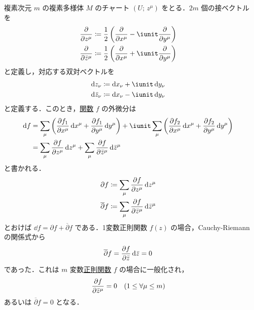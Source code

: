 \documentclass[geometry_main]{subfiles}
\begin{document}
複素次元 $m$ の複素多様体 $M$ のチャート $(U;\, z^\mu)$ をとる．$2m$ 個の接ベクトルを
\begin{align} 
	\pdv{}{z^\mu} &\coloneqq \frac{1}{2} \left(\pdv{}{x^\mu} - \iunit \pdv{}{y^\mu}\right) \\
	\pdv{}{\bar{z}^\mu} &\coloneqq \frac{1}{2} \left(\pdv{}{x^\mu} + \iunit \pdv{}{y^\mu}\right) \\
\end{align}
と定義し，対応する双対ベクトルを
\begin{align} 
	\dd{z_\nu} &\coloneqq \dd{x_\nu} + \iunit \dd{y_\nu} \\
	\dd{\bar{z}_\nu} &\coloneqq \dd{x_\nu} - \iunit \dd{y_\nu} \\
\end{align}
と定義する．このとき，\underline{\cinfty 関数} $f$ の外微分は
\begin{align} 
	\dd{f} &= \sum_\mu \left(\pdv{f_1}{x^\mu} \dd{x^\mu} + \pdv{f_1}{y^\mu} \dd{y^\mu} \right) + \iunit \sum_\mu \left(\pdv{f_2}{x^\mu} \dd{x^\mu} + \pdv{f_2}{y^\mu} \dd{y^\mu} \right) \\
	&= \sum_\mu \pdv{f}{z^\mu} \dd{z^\mu} + \sum_\mu \pdv{f}{\bar{z}^\mu} \dd{\bar{z}^\mu}
\end{align}
と書かれる．
\begin{align} 
	\partial f &\coloneqq \sum_\mu \pdv{f}{z^\mu} \dd{z^\mu} \\
	\overline{\partial} f &\coloneqq \sum_\mu \pdv{f}{\bar{z}^\mu} \dd{\bar{z}^\mu}
\end{align}
とおけば $\dd{f} = \partial f + \overline{\partial} f$ である．1変数正則関数 $f(z)$ の場合，Cauchy-Riemannの関係式から
\begin{align} 
	\overline{\partial} f = \pdv{f}{\bar{z}} \dd{\bar{z}} = 0
\end{align}
であった．これは $m$ 変数\underline{正則関数} $f$ の場合に一般化され，
\begin{align} 
	\pdv{f}{\bar{z}^\mu} = 0\quad (1\le \forall \mu\le m)
\end{align}
あるいは $\overline{\partial} f = 0$ となる．
\end{document}
